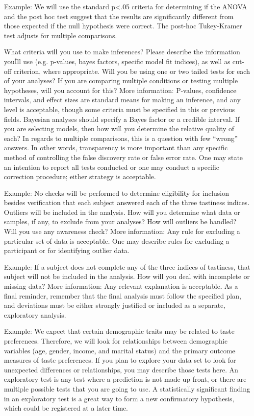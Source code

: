 \documentclass[highlight, explanations]{prereg}
\begin{document}
{Example: We will use the standard p<.05 criteria for determining if the ANOVA and the post hoc test suggest that the results are significantly different from those expected if the null hypothesis were correct. The post-hoc Tukey-Kramer test adjusts for multiple comparisons. 
}
{What criteria will you use to make inferences? Please describe the information youÍll use (e.g. p-values, bayes factors, specific model fit indices), as well as cut-off criterion, where appropriate. Will you be using one or two tailed tests for each of your analyses? If you are comparing multiple conditions or testing multiple hypotheses, will you account for this?
More information: P-values, confidence intervals, and effect sizes are standard means for making an inference, and any level is acceptable, though some criteria must be specified in this or previous fields. Bayesian analyses should specify a Bayes factor or a credible interval. If you are selecting models, then how will you determine the relative quality of each? In regards to multiple comparisons, this is a question with few “wrong” answers. In other words, transparency is more important than any specific method of controlling the false discovery rate or false error rate. One may state an intention to report all tests conducted or one may conduct a specific correction procedure; either strategy is acceptable.

}

{Example: No checks will be performed to determine eligibility for inclusion besides verification that each subject answered each of the three tastiness indices. Outliers will be included in the analysis.
}
{How will you determine what data or samples, if any, to exclude from your analyses? How will outliers be handled? Will you use any awareness check? More information: Any rule for excluding a particular set of data is acceptable. One may describe rules for excluding a participant or for identifying outlier data.
}

{Example: If a subject does not complete any of the three indices of tastiness, that subject will not be included in the analysis.
}
{How will you deal with incomplete or missing data? More information: Any relevant explanation is acceptable. As a final reminder, remember that the final analysis must follow the specified plan, and deviations must be either strongly justified or included as a separate, exploratory analysis.
}

{Example: We expect that certain demographic traits may be related to taste preferences. Therefore, we will look for relationships between demographic variables (age, gender, income, and marital status) and the primary outcome measures of taste preferences.
}
{If you plan to explore your data set to look for unexpected differences or relationships, you may describe those tests here. An exploratory test is any test where a prediction is not made up front, or there are multiple possible tests that you are going to use. A statistically significant finding in an exploratory test is a great way to form a new confirmatory hypothesis, which could be registered at a later time. 
}
\end{document}
